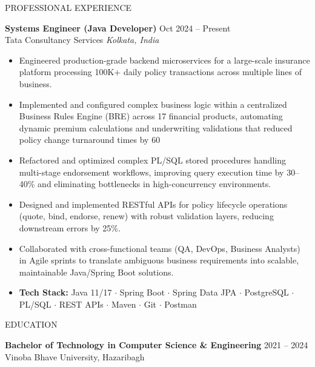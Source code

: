 \documentclass{resume} %
\begin{document}
\begin{rSection}{PROFESSIONAL EXPERIENCE}

    \textbf{Systems Engineer (Java Developer)} \hfill Oct 2024 -- Present\\
    Tata Consultancy Services \hfill \textit{Kolkata, India}
    \begin{itemize}
        \itemsep -3pt
        \item Engineered production-grade backend microservices for a large-scale insurance
              platform processing 100K+ daily policy transactions across multiple lines of
              business.
        \item Implemented and configured complex business logic within a centralized Business
              Rules Engine (BRE) across 17 financial products, automating dynamic premium
              calculations and underwriting validations that reduced policy change turnaround
              times by 60%
        \item Refactored and optimized complex PL/SQL stored procedures handling multi-stage
              endorsement workflows, improving query execution time by 30--40\% and
              eliminating bottlenecks in high-concurrency environments.
        \item Designed and implemented RESTful APIs for policy lifecycle operations (quote,
              bind, endorse, renew) with robust validation layers, reducing downstream errors
              by 25\%.
        \item Collaborated with cross-functional teams (QA, DevOps, Business Analysts) in
              Agile sprints to translate ambiguous business requirements into scalable,
              maintainable Java/Spring Boot solutions.
        \item \textbf{Tech Stack:} Java 11/17 $\cdot$ Spring Boot $\cdot$ Spring Data JPA $\cdot$ PostgreSQL $\cdot$ PL/SQL $\cdot$ REST APIs $\cdot$ Maven $\cdot$ Git $\cdot$ Postman
    \end{itemize}

\end{rSection}

\begin{rSection}{EDUCATION}

    {\bf Bachelor of Technology in Computer Science \& Engineering} \hfill {2021 -- 2024}\\
    Vinoba Bhave University, Hazaribagh

\end{rSection}
\end{document}
